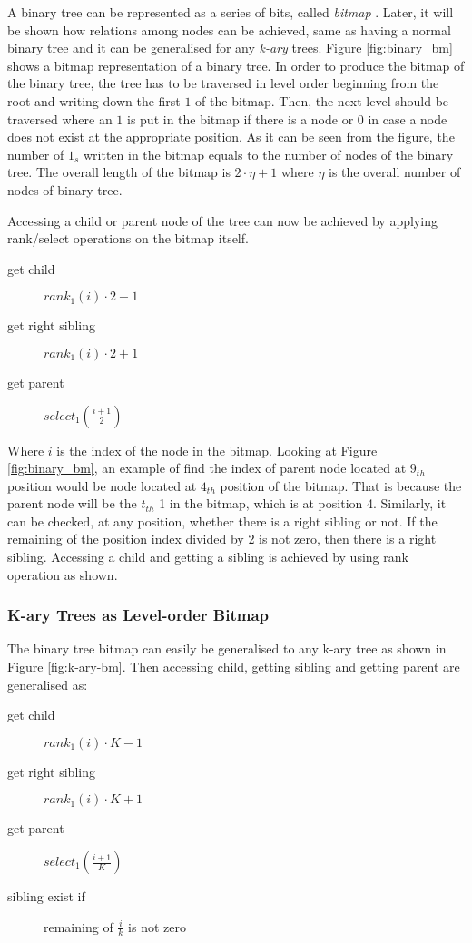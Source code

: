 A binary tree can be represented as a series of bits, called \emph{bitmap} \cite{jacobson_space-efficient_1989} . Later, it will be shown how relations among nodes can be achieved, same as having a normal binary tree and it can be generalised for any \emph{k-ary} trees. Figure \ref{fig:binary_bm} shows a bitmap representation of a binary tree. In order to produce the bitmap of the binary tree, the tree has to be traversed in level order beginning from the root and writing down the first $1$ of the bitmap. Then, the next level should be traversed where an $1$ is put in the bitmap if there is a node or $0$ in case a node does not exist at the appropriate position. As it can be seen from the figure, the number of $1_s$ written in the bitmap equals to the number of nodes of the binary tree. The overall length of the bitmap is $2 \cdot \eta  + 1$ where $\eta$ is the overall number of nodes of binary tree.
\par Accessing a child or parent node of the tree can now be achieved by applying rank/select operations on the bitmap itself. 
\begin{description}
	\item [get child] \(rank_1(i) \cdot 2 - 1\)
	\item [get right sibling] \(rank_1(i) \cdot 2 + 1\)
	\item [get parent] \(select_1(\frac{i + 1}{2} )\)
\end{description}

Where \(i\) is the index of the node in the bitmap. Looking at Figure \ref{fig:binary_bm}, an example of find the index of parent node located at $9_{th}$ position would be node located at $4_{th}$ position of the bitmap. That is because the parent node will be the $t_{th}$ 1 in the bitmap, which is at position 4. Similarly, it can be checked, at any position, whether there is a right sibling or not. If the remaining of the position index divided by 2 is not zero, then there is a right sibling. Accessing a child and getting a sibling is achieved by using rank operation as shown.

\subsubsection*{K-ary Trees as Level-order Bitmap}
The binary tree bitmap can easily be generalised to any k-ary tree as shown in Figure \ref{fig:k-ary-bm}. Then accessing child, getting sibling and getting parent are generalised as:

\begin{description}
	\item [get child] \(rank_1(i) \cdot K - 1\)
	\item [get right sibling] \(rank_1(i) \cdot K + 1\)
	\item [get parent] \(select_1(\frac{i + 1}{K} )\)
	\item [sibling exist if] remaining of \(\frac{i}{k}\) is not zero
\end{description}

